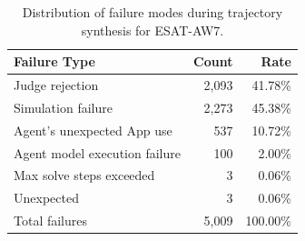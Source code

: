 \begin{table}[t]
\centering
\small
\begin{tabular}{lrr}
\toprule
\textbf{Failure Type} & \textbf{Count} & \textbf{Rate} \\
\midrule
Judge rejection & 2,093 & 41.78\% \\
Simulation failure &  2,273  & 45.38\% \\
Agent's unexpected App use & 537 & 10.72\% \\
Agent model execution failure & 100 & 2.00\% \\
Max solve steps exceeded & 3 & 0.06\% \\
Unexpected & 3 & 0.06\% \\
\midrule
Total failures & 5,009 & 100.00\% \\
\bottomrule
\end{tabular}
\caption{Distribution of failure modes during trajectory synthesis for \textsc{ESAT}-AW7.}
\label{tab:failure_distribution}
\end{table}
